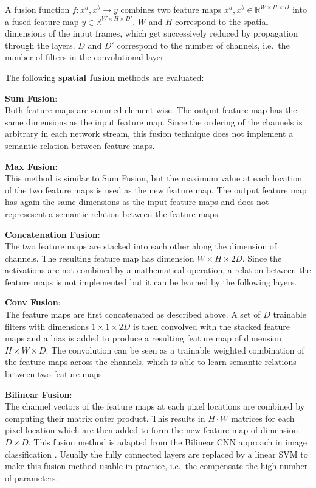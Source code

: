A fusion function $f: x^a, x^b \rightarrow y$ combines two feature maps $x^a, x^b \in \mathbb{R}^{W \times H \times D}$ into a fused feature map $y \in \mathbb{R}^{W \times H \times D'}$.
$W$ and $H$ correspond to the spatial dimensions of the input frames, which get successively reduced by propagation through the layers.
$D$ and $D'$ correspond to the number of channels, i.e.\ the number of filters in the convolutional layer. 

The following \textbf{spatial fusion} methods are evaluated:

\textbf{Sum Fusion}:\\
Both feature maps are summed element-wise.
The output feature map has the same dimensions as the input feature map.
Since the ordering of the channels is arbitrary in each network stream, this fusion technique does not implement a semantic relation between feature maps.

\textbf{Max Fusion}:\\
This method is similar to Sum Fusion, but the maximum value at each location of the two feature maps is used as the new feature map.
The output feature map has again the same dimensions as the input feature maps and does not represesent a semantic relation between the feature maps.

\textbf{Concatenation Fusion}:\\
The two feature maps are stacked into each other along the dimension of channels.
The resulting feature map has dimension $W \times H \times 2D$.
Since the activations are not combined by a mathematical operation, a relation between the feature maps is not implemented but it can be learned by the following layers.

\textbf{Conv Fusion}:\\
The feature maps are first concatenated as described above.
A set of $D$ trainable filters with dimensions $1 \times 1 \times 2D$ is then convolved with the stacked feature maps and a bias is added to produce a resulting feature map of dimension $H \times W \times D$.
The convolution can be seen as a trainable weighted combination of the feature maps across the channels, which is able to learn semantic relations between two feature maps.

\textbf{Bilinear Fusion}:\\
The channel vectors of the feature maps at each pixel locations are combined by computing their matrix outer product.
This results in $H \cdot W$ matrices for each pixel location which are then added to form the new feature map of dimension $D \times D$.
This fusion method is adapted from the Bilinear CNN approach in image classification \cite{lin_bilinear_2015}.
Usually the fully connected layers are replaced by a linear SVM to make this fusion method usable in practice, i.e.\ the compensate the high number of parameters.

